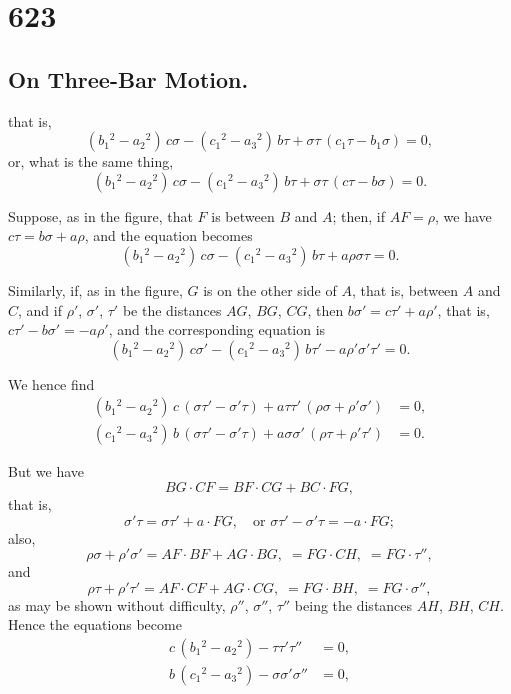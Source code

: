 \documentclass[12pt,a4paper]{article}
\begin{document}
\section*{623}
\subsection*{On Three-Bar Motion.\quad [Continued]}

\setcounter{equation}{0}
\noindent
that is,
\[
(b_1{}^{\!2} - a_2{}^{\!2})\, c\sigma - (c_1{}^{\!2} - a_3{}^{\!2})\, b\tau + \sigma\tau\, (c_1\tau - b_1\sigma) = 0,
\]
or, what is the same thing,
\[
(b_1{}^{\!2} - a_2{}^{\!2})\, c\sigma - (c_1{}^{\!2} - a_3{}^{\!2})\, b\tau + \sigma\tau\, (c\tau - b\sigma) = 0.
\]

Suppose, as in the figure, that $F$ is between $B$ and $A$; then, if $AF = \rho$, we have $c\tau = b\sigma + a\rho$, and the equation becomes
\[
(b_1{}^{\!2} - a_2{}^{\!2})\, c\sigma - (c_1{}^{\!2} - a_3{}^{\!2})\, b\tau + a\rho\sigma\tau = 0.
\]

Similarly, if, as in the figure, $G$ is on the other side of $A$, that is, between $A$ and $C$, and if $\rho'$, $\sigma'$, $\tau'$ be the distances $AG$, $BG$, $CG$, then $b\sigma' = c\tau' + a\rho'$, that is, $c\tau' - b\sigma' = -a\rho'$, and the corresponding equation is
\[
(b_1{}^{\!2} - a_2{}^{\!2})\, c\sigma' - (c_1{}^{\!2} - a_3{}^{\!2})\, b\tau' - a\rho'\sigma'\tau' = 0.
\]

We hence find
\begin{align*}
(b_1{}^{\!2} - a_2{}^{\!2})\, c\, (\sigma\tau' - \sigma'\tau) + a\tau\tau'\, (\rho\sigma + \rho'\sigma') &= 0, \\
(c_1{}^{\!2} - a_3{}^{\!2})\, b\, (\sigma\tau' - \sigma'\tau) + a\sigma\sigma'\, (\rho\tau + \rho'\tau') &= 0.
\end{align*}

But we have
\[
BG \cdot CF = BF \cdot CG + BC \cdot FG,
\]
that is,
\[
\sigma'\tau = \sigma\tau' + a \cdot FG, \quad \text{or } \sigma\tau' - \sigma'\tau = -a \cdot FG;
\]
also,
\[
\rho\sigma + \rho'\sigma' = AF \cdot BF + AG \cdot BG, \;= FG \cdot CH, \;= FG \cdot \tau'',
\]
and
\[
\rho\tau + \rho'\tau' = AF \cdot CF + AG \cdot CG, \;= FG \cdot BH, \;= FG \cdot \sigma'',
\]
as may be shown without difficulty, $\rho''$, $\sigma''$, $\tau''$ being the distances $AH$, $BH$, $CH$.
Hence the equations become
\begin{align*}
c\, (b_1{}^{\!2} - a_2{}^{\!2}) - \tau\tau'\tau'' &= 0, \\
b\, (c_1{}^{\!2} - a_3{}^{\!2}) - \sigma\sigma'\sigma'' &= 0,
\end{align*}
\end{document}

